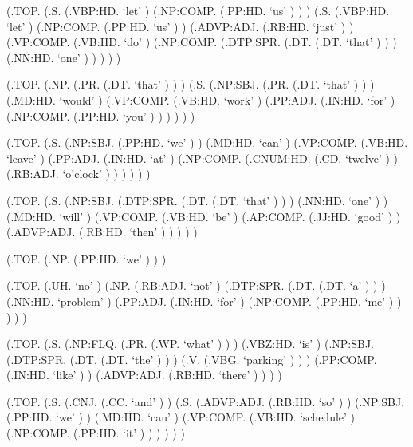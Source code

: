 \documentclass[10pt]{article}
\begin{document}
\begin{parsetree}  (.TOP. (.S. (.VBP:HD. `let' ) (.NP:COMP. (.PP:HD. `us' ) ) ) (.S. (.VBP:HD. `let' ) (.NP:COMP. (.PP:HD. `us' ) ) (.ADVP:ADJ. (.RB:HD. `just' ) ) (.VP:COMP. (.VB:HD. `do' ) (.NP:COMP. (.DTP:SPR. (.DT. (.DT. `that' ) ) ) (.NN:HD. `one' ) ) ) ) ) \end{parsetree}

\begin{parsetree}  (.TOP. (.NP. (.PR. (.DT. `that' ) ) ) (.S. (.NP:SBJ. (.PR. (.DT. `that' ) ) ) (.MD:HD. `would' ) (.VP:COMP. (.VB:HD. `work' ) (.PP:ADJ. (.IN:HD. `for' ) (.NP:COMP. (.PP:HD. `you' ) ) ) ) ) ) \end{parsetree}

\begin{parsetree}  (.TOP. (.S. (.NP:SBJ. (.PP:HD. `we' ) ) (.MD:HD. `can' ) (.VP:COMP. (.VB:HD. `leave' ) (.PP:ADJ. (.IN:HD. `at' ) (.NP:COMP. (.CNUM:HD. (.CD. `twelve' ) ) (.RB:ADJ. `o'clock' ) ) ) ) ) ) \end{parsetree}

\begin{parsetree}  (.TOP. (.S. (.NP:SBJ. (.DTP:SPR. (.DT. (.DT. `that' ) ) ) (.NN:HD. `one' ) ) (.MD:HD. `will' ) (.VP:COMP. (.VB:HD. `be' ) (.AP:COMP. (.JJ:HD. `good' ) ) (.ADVP:ADJ. (.RB:HD. `then' ) ) ) ) ) \end{parsetree}

\begin{parsetree}  (.TOP. (.NP. (.PP:HD. `we' ) ) ) \end{parsetree}

\begin{parsetree}  (.TOP. (.UH. `no' ) (.NP. (.RB:ADJ. `not' ) (.DTP:SPR. (.DT. (.DT. `a' ) ) ) (.NN:HD. `problem' ) (.PP:ADJ. (.IN:HD. `for' ) (.NP:COMP. (.PP:HD. `me' ) ) ) ) ) \end{parsetree}

\begin{parsetree}  (.TOP. (.S. (.NP:FLQ. (.PR. (.WP. `what' ) ) ) (.VBZ:HD. `is' ) (.NP:SBJ. (.DTP:SPR. (.DT. (.DT. `the' ) ) ) (.V. (.VBG. `parking' ) ) ) (.PP:COMP. (.IN:HD. `like' ) ) (.ADVP:ADJ. (.RB:HD. `there' ) ) ) ) \end{parsetree}

\begin{parsetree}  (.TOP. (.S. (.CNJ. (.CC. `and' ) ) (.S. (.ADVP:ADJ. (.RB:HD. `so' ) ) (.NP:SBJ. (.PP:HD. `we' ) ) (.MD:HD. `can' ) (.VP:COMP. (.VB:HD. `schedule' ) (.NP:COMP. (.PP:HD. `it' ) ) ) ) ) ) \end{parsetree}
\end{document}
